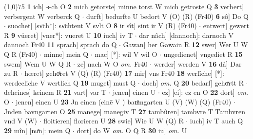 \documentclass[8pt,a4paper,notitlepage]{article}
\begin{document}
\begin{table}[ht]
\begin{minipage}[t]{0.5\linewidth}
\line(1,0){75} \newline
\textbf{1} ich] ÷ch O \textbf{2} mich getorste] minne torst W mich getroste Q \textbf{3} verbert] verbergent W verberck Q  $\cdot$ durft] bedurfte U bedort V (O) (R) (Fr40) \textbf{6} sô] Do Q  $\cdot$ suochet] [svͦch*]: svͦchtent V svlt O \textbf{8} ir sît] sint ir V (R) (Fr40)  $\cdot$ entwert] gewert R \textbf{9} vüeret] [vner*]: vueret U \textbf{10} iuch] iv T  $\cdot$ dar nâch] [dannoch]: darnoch V dannoch Fr40 \textbf{11} sprach] sprach do Q  $\cdot$ Gawan] her Gawain R \textbf{12} swer] Wer U W Q R (Fr40)  $\cdot$ minne] mein Q  $\cdot$ mac] [*]: wil V wil O  $\cdot$ ungedienet] vngediet R \textbf{15} swem] Wem U W Q R  $\cdot$ ze] nach W O \textit{om.} Fr40  $\cdot$ werder] werden V \textbf{16} dâ] Dar zu R  $\cdot$ hœret] gehoͤret V (Q) (R) (Fr40) \textbf{17} mir] vns Fr40 \textbf{18} werlîche] [*]: werdecliche V wertlich Q \textbf{19} muget] must Q  $\cdot$ doch] \textit{om.} Q \textbf{20} bedarf] gehoͯrtt R  $\cdot$ deheines] keinem R \textbf{21} vart] var T  $\cdot$ jenen] einen U  $\cdot$ ez] [ei]: ez en O \textbf{22} dort] \textit{om.} O  $\cdot$ jenen] einen U \textbf{23} Jn einen (einē V ) bauͦmgarten U (V) (W) (Q) (Fr40)  $\cdot$ Jnden bavngarten O \textbf{25} manege] manegiv T \textbf{27} tambûren] tambvre T Tambvren vnd V (W)  $\cdot$ floitieren] florieren U \textbf{28} swie] Wie U W (Q) R  $\cdot$ iuch] iv T auch Q \textbf{29} mîn] [nuͯn]: mein Q  $\cdot$ dort] do W \textit{om.} O Q R \textbf{30} iu] \textit{om.} U \newline
\end{minipage}
\end{table}
\end{document}
